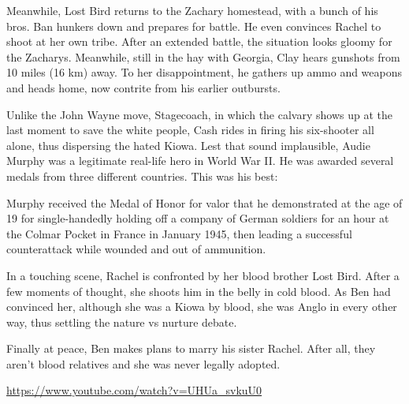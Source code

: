 Meanwhile, Lost Bird returns to the Zachary homestead, with a bunch of his bros. Ban hunkers down and prepares for battle. He even convinces Rachel to shoot at her own tribe. After an extended battle, the situation looks gloomy for the Zacharys. Meanwhile, still in the hay with Georgia, Clay hears gunshots from 10 miles (16 km) away. To her disappointment, he gathers up ammo and weapons and heads home, now contrite from his earlier outbursts.

Unlike the John Wayne move, Stagecoach, in which the calvary shows up at the last moment to save the white people, Cash rides in firing his six-shooter all alone, thus dispersing the hated Kiowa. Lest that sound implausible, Audie Murphy was a legitimate real-life hero in World War II. He was awarded several medals from three different countries. This was his best:

\begin{quotex}
Murphy received the Medal of Honor for valor that he demonstrated at the age of 19 for single-handedly holding off a company of German soldiers for an hour at the Colmar Pocket in France in January 1945, then leading a successful counterattack while wounded and out of ammunition.
\end{quotex}


In a touching scene, Rachel is confronted by her blood brother Lost Bird. After a few moments of thought, she shoots him in the belly in cold blood. As Ben had convinced her, although she was a Kiowa by blood, she was Anglo in every other way, thus settling the nature vs nurture debate.

Finally at peace, Ben makes plans to marry his sister Rachel. After all, they aren't blood relatives and she was never legally adopted.

\url{https://www.youtube.com/watch?v=UHUa\_svkuU0} 


